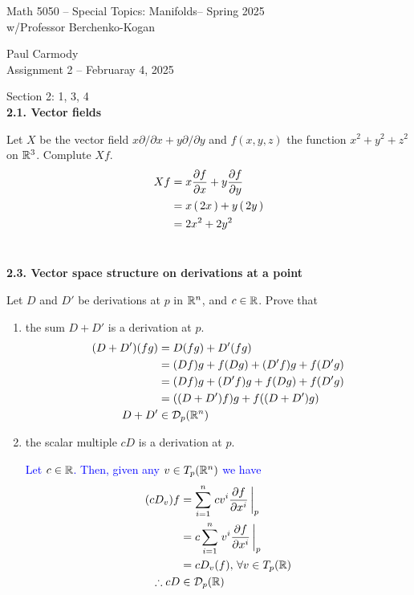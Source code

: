\documentclass[10pt,a4paper]{report}
\newcommand{\CLASSNAME}{Math 5050 -- Special Topics: Manifolds}
\newcommand{\STUDENTNAME}{Paul Carmody}
\newcommand{\ASSIGNMENT}{Assignment 2 }
\newcommand{\DUEDATE}{Februaray 4, 2025}
\newcommand{\SEMESTER}{Spring 2025}
\newcommand{\BLUE}[1]{\textcolor{blue}{#1}}
\begin{document}
\begin{center}
	\Large{\CLASSNAME -- \SEMESTER} \\
	\large{ w/Professor Berchenko-Kogan}
\end{center}
\begin{center}
	\STUDENTNAME \\
	\ASSIGNMENT -- \DUEDATE\\
\end{center} 

\noindent Section 2: 1, 3, 4\\

\noindent \textbf{2.1. Vector fields}

\noindent Let $X$ be the vector field $x\partial/\partial x + y\partial/\partial y$ and $f(x,y,z)$ the function $x^2+y^2+z^2$ on $\mathbb{R}^3$.  Complute $Xf$.\\

\BLUE{\begin{align*}
	Xf &= x\frac{\partial f}{\partial x}+y\frac{\partial f}{\partial y} \\
	&= x\left (\, 2x \,\right )+y\left (\, 2y \,\right )\\
	&= 2x^2+2y^2
\end{align*}
\\}

\noindent \textbf{2.3. Vector space structure on derivations at a point}

\noindent Let $D$ and $D'$ be derivations at $p$ in $\mathbb{R}^n$, and $c \in \mathbb{R}$.  Prove that
\begin{enumerate}[label=(\alph*)]
	\item the sum $D+D'$ is a derivation at $p$.
	\BLUE{
		\begin{align*}
			(D+D')(fg) &= D(fg)+D'(fg) \\
			&= (Df)g+f(Dg) + (D'f)g+f(D'g) \\
			&= (Df)g + (D'f)g+f(Dg)+f(D'g) \\
			&= ((D+D')f)g+f((D+D')g) \\
			D + D' &\in \mathcal{D}_p(\mathbb{R}^n)
		\end{align*}
	}
	
	\item the scalar multiple $cD$ is a derivation at $p$.
	
	\BLUE{Let $c \in \mathbb{R}$.  Then, given any $v \in T_p(\mathbb{R}^n)$ we have
	\begin{align*}
		(cD_v)f &= \sum_{i=1}^n \left . cv^i \frac{\partial f}{\partial x^i} \, \right |_p \\
		&=c\sum_{i=1}^n \left . v^i \frac{\partial f}{\partial x^i} \, \right |_p \\
		&= cD_v(f), \, \forall v \in T_p(\mathbb{R})  \\
		\therefore cD &\in \mathcal{D}_p(\mathbb{R})
	\end{align*}
	}
\end{enumerate}
\end{document}
